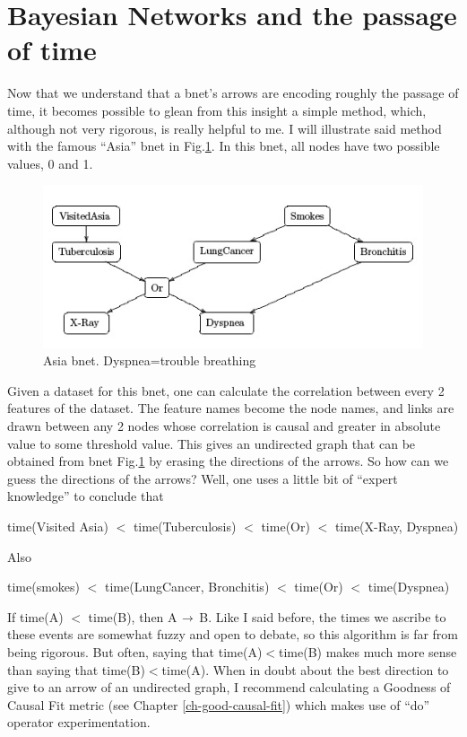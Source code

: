 \section{Bayesian Networks and the passage of time}

Now that we understand that a bnet’s arrows are encoding roughly the passage
of time, it becomes possible to glean from this insight a simple method,
which, although not very rigorous, is really helpful to me. I will illustrate
said method with the famous ``Asia” bnet in Fig.\ref{fig-asia}.
 In this bnet, all nodes
have two  possible values, 0 and 1.

\begin{figure}[h!]
\centering
\includegraphics[width=5in]
{bnets-time/asia.jpg}
\caption{Asia bnet. Dyspnea=trouble breathing}
\label{fig-asia}
\end{figure}


Given a dataset for this bnet, one can calculate the correlation between
every 2 features of the dataset. The feature names become the node names, and
links are drawn between any 2 nodes whose correlation is 
causal and greater in absolute
value to some threshold value.
This gives an undirected graph that can be
obtained from bnet Fig.\ref{fig-asia}
 by erasing the directions of the arrows. So how
can we guess the directions of the arrows? Well, one uses a little bit of
``expert knowledge” to conclude that

time(Visited Asia) $<$ time(Tuberculosis) $<$ time(Or) $<$ time(X-Ray,
Dyspnea)

Also

time(smokes) $<$ time(LungCancer, Bronchitis) $<$ time(Or) $<$ time(Dyspnea)

If time(A) $<$ time(B), then A $\rightarrow$ B. Like I
said before, the times we ascribe to
these events are somewhat fuzzy and open to debate, so this algorithm is far
from being rigorous. But often, saying that  time(A)$<$time(B) makes much more
sense than saying that time(B)$<$time(A). When in doubt about the best
direction to give to an arrow of an undirected graph, I recommend calculating
a Goodness of Causal Fit metric (see Chapter
\ref{ch-good-causal-fit}) which makes use of ``do” operator
experimentation.


